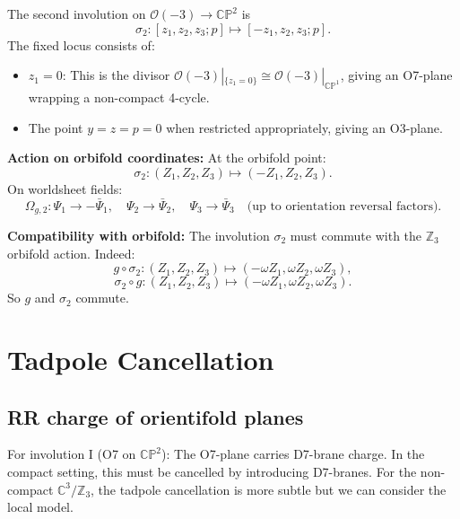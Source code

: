 \documentclass[11pt]{article}
\newcommand{\Z}{\mathbb{Z}}
\newcommand{\C}{\mathbb{C}}
\newcommand{\CP}{\mathbb{CP}}
\newcommand{\cO}{\mathcal{O}}
\begin{document}
The second involution on $\cO(-3) \to \CP^2$ is
\begin{equation}\label{eq:inv2}
\sigma_2: [z_1, z_2, z_3; p] \mapsto [-z_1, z_2, z_3; p].
\end{equation}
The fixed locus consists of:
\begin{itemize}
\item $z_1 = 0$: This is the divisor $\cO(-3)|_{\{z_1=0\}} \cong \cO(-3)|_{\CP^1}$, giving an O7-plane wrapping a non-compact 4-cycle.
\item The point $y = z = p = 0$ when restricted appropriately, giving an O3-plane.
\end{itemize}

\textbf{Action on orbifold coordinates:} At the orbifold point:
\begin{equation}
\sigma_2: (Z_1, Z_2, Z_3) \mapsto (-Z_1, Z_2, Z_3).
\end{equation}
On worldsheet fields:
\begin{equation}
\Omega_{g,2}: \Psi_1 \to -\bar{\Psi}_1, \quad \Psi_2 \to \bar{\Psi}_2, \quad \Psi_3 \to \bar{\Psi}_3 \quad \text{(up to orientation reversal factors)}.
\end{equation}

\textbf{Compatibility with orbifold:} The involution $\sigma_2$ must commute with the $\Z_3$ orbifold action. Indeed:
\begin{equation}
g \circ \sigma_2: (Z_1, Z_2, Z_3) \mapsto (-\omega Z_1, \omega Z_2, \omega Z_3),
\end{equation}
\begin{equation}
\sigma_2 \circ g: (Z_1, Z_2, Z_3) \mapsto (-\omega Z_1, \omega Z_2, \omega Z_3).
\end{equation}
So $g$ and $\sigma_2$ commute.

\section{Tadpole Cancellation}

\subsection{RR charge of orientifold planes}

For involution I (O7 on $\CP^2$): The O7-plane carries D7-brane charge. In the compact setting, this must be cancelled by introducing D7-branes. For the non-compact $\C^3/\Z_3$, the tadpole cancellation is more subtle but we can consider the local model.
\end{document}
